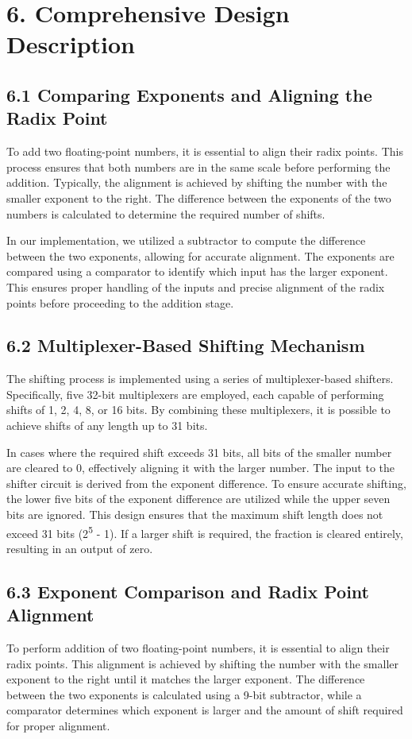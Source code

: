 \documentclass{article}
\begin{document}
\section*{6. Comprehensive Design Description}
\subsection*{6.1 Comparing Exponents and Aligning the Radix Point}

To add two floating-point numbers, it is essential to align their radix points. This process ensures that both numbers are in the same scale before performing the addition. Typically, the alignment is achieved by shifting the number with the smaller exponent to the right. The difference between the exponents of the two numbers is calculated to determine the required number of shifts.

In our implementation, we utilized a subtractor to compute the difference between the two exponents, allowing for accurate alignment. The exponents are compared using a comparator to identify which input has the larger exponent. This ensures proper handling of the inputs and precise alignment of the radix points before proceeding to the addition stage.



\subsection*{6.2 Multiplexer-Based Shifting Mechanism}
The shifting process is implemented using a series of multiplexer-based shifters. Specifically, five 32-bit multiplexers are employed, each capable of performing shifts of 1, 2, 4, 8, or 16 bits. By combining these multiplexers, it is possible to achieve shifts of any length up to 31 bits. 

In cases where the required shift exceeds 31 bits, all bits of the smaller number are cleared to 0, effectively aligning it with the larger number. The input to the shifter circuit is derived from the exponent difference. To ensure accurate shifting, the lower five bits of the exponent difference are utilized while the upper seven bits are ignored. This design ensures that the maximum shift length does not exceed 31 bits (2\textsuperscript{5} - 1). If a larger shift is required, the fraction is cleared entirely, resulting in an output of zero.

\subsection*{6.3 Exponent Comparison and Radix Point Alignment}
To perform addition of two floating-point numbers, it is essential to align their radix points. This alignment is achieved by shifting the number with the smaller exponent to the right until it matches the larger exponent. The difference between the two exponents is calculated using a 9-bit subtractor, while a comparator determines which exponent is larger and the amount of shift required for proper alignment.
\end{document}
